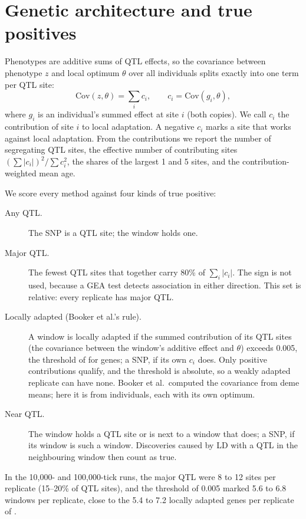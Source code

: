 \section{Genetic architecture and true positives}
\label{sec:architecture}

Phenotypes are additive sums of QTL effects, so the covariance between
phenotype $z$ and local optimum $\theta$ over all individuals splits
exactly into one term per QTL site:
\begin{equation*}
\mathrm{Cov}(z,\theta) = \sum_i c_i, \qquad c_i = \mathrm{Cov}(g_i, \theta),
\end{equation*}
where $g_i$ is an individual's summed effect at site $i$ (both copies). We
call $c_i$ the contribution of site $i$ to local adaptation. A negative
$c_i$ marks a site that works against local adaptation. From the
contributions we report the number of segregating QTL sites, the effective
number of contributing sites $(\sum|c_i|)^2/\sum c_i^2$, the shares of the
largest 1 and 5 sites, and the contribution-weighted mean age.

We score every method against four kinds of true positive:
\begin{description}
\item[Any QTL.] The SNP is a QTL site; the window holds one.
\item[Major QTL.] The fewest QTL sites that together carry 80\% of
  $\sum_i |c_i|$. The sign is not used, because a GEA test detects
  association in either direction. This set is relative: every replicate
  has major QTL.
\item[Locally adapted (Booker et al.'s rule).] A window is locally adapted
  if the summed contribution of its QTL sites (the covariance between the
  window's additive effect and $\theta$) exceeds 0.005, the threshold of
  \citet{booker_wza_2024} for genes; a SNP, if its own $c_i$ does. Only
  positive contributions qualify, and the threshold is absolute, so a
  weakly adapted replicate can have none. Booker et al.\ computed the
  covariance from deme means; here it is from individuals, each with its
  own optimum.
\item[Near QTL.] The window holds a QTL site or is next to a window that
  does; a SNP, if its window is such a window. Discoveries caused by LD
  with a QTL in the neighbouring window then count as true.
\end{description}

\noindent In the 10,000- and 100,000-tick runs, the major QTL were 8 to 12
sites per replicate (15--20\% of QTL sites), and the threshold of 0.005
marked 5.6 to 6.8 windows per replicate, close to the 5.4 to 7.2 locally
adapted genes per replicate of \citet{booker_wza_2024}.

